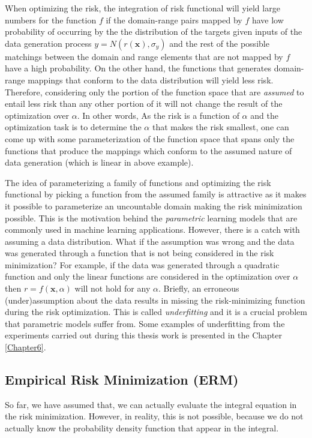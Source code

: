 {When optimizing the risk, the integration of risk functional will yield large numbers for the function $f$ if the domain-range pairs mapped by $f$ have low probability of occurring by the the distribution of the targets given inputs of the data generation process $y = N(r(\pmb{x}),\sigma{_y})$ and the rest of the possible matchings between the domain and range elements that are not mapped by $f$ have a high probability. On the other hand, the functions that generates domain-range mappings that conform to the data distribution will yield less risk. Therefore, considering only the portion of the function space that are \textit{assumed} to entail less risk than any other portion of it will not change the result of the optimization over $\alpha$. In other words, As the risk is a function of $\alpha$ and the optimization task is to determine the $\alpha$ that makes the risk smallest, one can come up with some parameterization of the function space that spans only the functions that produce the mappings which conform to the assumed nature of data generation (which is linear in above example). 

The idea of parameterizing a family of functions and optimizing the risk functional by picking a function from the assumed family is attractive as it makes it possible to parameterize an uncountable domain making the risk minimization possible. This is the motivation behind the \textit{parametric} learning models that are commonly used in machine learning applications. However, there is a catch with assuming a data distribution. What if the assumption was wrong and the data was generated through a function that is not being considered in the risk minimization? For example, if the data was generated through a quadratic function and only the linear functions are considered in the optimization over $\alpha$ then $r = f(\pmb{x},\alpha)$ will not hold for any $\alpha$. Briefly, an erroneous (under)assumption about the data results in missing the risk-minimizing function during the risk optimization. This is called \textit{underfitting} and it is a crucial problem that parametric models suffer from. Some examples of underfitting from the experiments carried out during this thesis work is presented in the Chapter \ref{Chapter6}. 

\subsection{Empirical Risk Minimization (ERM)}
\label{subsection:ERM}

So far, we have assumed that, we can actually evaluate the integral equation in the risk minimization. However, in reality, this is not possible, because we do not actually know the probability density function that appear in the integral.

}
